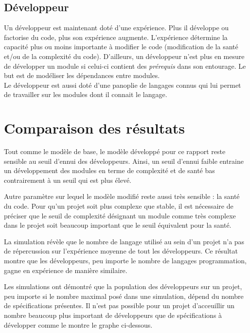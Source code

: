 \documentclass{article}
\begin{document}
\newpage
\subsection{Développeur}
Un développeur est maintenant doté d'une expérience. Plus il développe ou factorise du code, plus son expérience augmente. L'expérience détermine la capacité plus ou moins importante à modifier le code (modification de la santé et/ou de la complexité du code). 
D'ailleurs, un développeur n'est plus en mesure de développer un module si celui-ci contient des \textit{prérequis} dans son entourage. Le but est de modéliser les dépendances entre modules.
\\

Le développeur est aussi doté d'une panoplie de langages connus qui lui permet de travailler sur les modules dont il connait le langage.

\section{Comparaison des résultats}

Tout comme le modèle de base, le modèle développé pour ce rapport reste sensible au seuil d'ennui des développeurs. Ainsi, un seuil d'ennui faible 
entraine un développement des modules en terme de complexité et de santé bas contrairement à un seuil qui est plus élevé.


Autre paramètre sur lequel le modèle modifié reste aussi très sensible : la santé du code. Pour qu'un projet soit plus complexe que stable, il est nécessaire de préciser 
que le seuil de complexité désignant un module comme très complexe dans le projet soit beaucoup important que le seuil équivalent pour la santé.


La simulation révèle que le nombre de langage utilisé au sein d'un projet n'a pas de répercussion sur l'expérience moyenne de tout les développeurs.
Ce résultat montre que les développeurs, peu importe le nombre de langages programmation, gagne en expérience de manière similaire.


Les simulations ont démontré que la population des développeurs sur un projet, peu importe si le nombre maximal posé dans une simulation, dépend du nombre
de spécifications présentes. Il n'est pas possible pour un projet d'acceuillir un nombre beaucoup plus important de développeurs que de spécifications à développer comme le montre le graphe ci-dessous.
\end{document}
